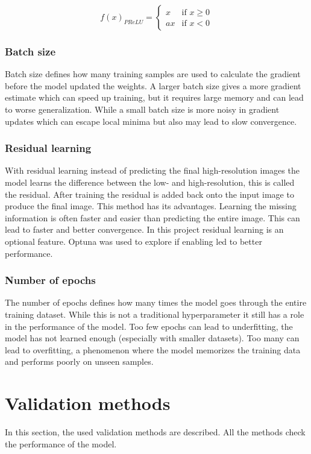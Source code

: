 \documentclass[twocolumn]{article}
\begin{document}
\begin{equation}\label{eq:7}
f(x)_{PReLU} = 
\begin{cases}
x & \text{if } x \geq 0 \\
a x & \text{if } x < 0
\end{cases}
\end{equation}

\subsubsection{Batch size}
Batch size defines how many training samples are used to calculate the gradient before the model updated the weights. 
A larger batch size gives a more gradient estimate which can speed up training, but it requires large memory and can lead to worse generalization. 
While a small batch size is more noisy in gradient updates which can escape local minima but also may lead to slow convergence. 

\subsubsection{Residual learning}
With residual learning instead of predicting the final high-resolution images the model learns the difference between the low- and high-resolution, this is called the residual. 
After training the residual is added back onto the input image to produce the final image. This method has its advantages. 
Learning the missing information is often faster and easier than predicting the entire image. This can lead to faster and better convergence. 
In this project residual learning is an optional feature. Optuna was used to explore if enabling led to better performance.

\subsubsection{Number of epochs}
The number of epochs defines how many times the model goes through the entire training dataset. 
While this is not a traditional hyperparameter it still has a role in the performance of the model. 
Too few epochs can lead to underfitting, the model has not learned enough (especially with smaller datasets). 
Too many can lead to overfitting, a phenomenon where the model memorizes the training data and performs poorly on unseen samples. 

\section{Validation methods}
In this section, the used validation methods are described. All the methods check the performance of the model. 
\end{document}
